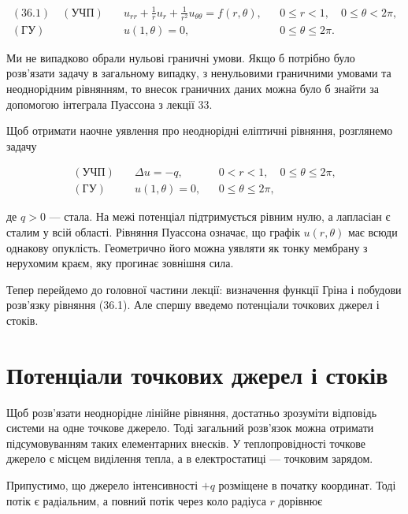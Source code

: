 \documentclass[
  ukrainian,
]{article}
\begin{document}
\[\begin{aligned}(36.1)\quad (\text{УЧП})\quad &u_{rr} + \frac{1}{r}u_r + \frac{1}{r^2}u_{\theta\theta} = f(r,\theta),&& 0 \le r < 1,\quad 0 \le \theta < 2\pi, \\(\text{ГУ})\quad &u(1,\theta)=0,&& 0 \le \theta \le 2\pi.\end{aligned}\]

Ми не випадково обрали нульові граничні умови. Якщо б потрібно було
розв'язати задачу в загальному випадку, з ненульовими граничними умовами
та неоднорідним рівнянням, то внесок граничних даних можна було б знайти
за допомогою інтеграла Пуассона з лекції 33.

Щоб отримати наочне уявлення про неоднорідні еліптичні рівняння,
розглянемо задачу

\[\begin{aligned}(\text{УЧП})\quad & \Delta u = -q, && 0 < r < 1,\quad 0 \le \theta \le 2\pi, \\(\text{ГУ})\quad & u(1,\theta)=0, && 0 \le \theta \le 2\pi,\end{aligned}\]

де \(q>0\) --- стала. На межі потенціал підтримується рівним нулю, а
лапласіан є сталим у всій області. Рівняння Пуассона означає, що графік
\(u(r,\theta)\) має всюди однакову опуклість. Геометрично його можна
уявляти як тонку мембрану з нерухомим краєм, яку прогинає зовнішня сила.

Тепер перейдемо до головної частини лекції: визначення функції Гріна і
побудови розв'язку рівняння (36.1). Але спершу введемо потенціали
точкових джерел і стоків.

\section{Потенціали точкових джерел і
стоків}\label{ux43fux43eux442ux435ux43dux446ux456ux430ux43bux438-ux442ux43eux447ux43aux43eux432ux438ux445-ux434ux436ux435ux440ux435ux43b-ux456-ux441ux442ux43eux43aux456ux432}

Щоб розв'язати неоднорідне лінійне рівняння, достатньо зрозуміти
відповідь системи на одне точкове джерело. Тоді загальний розв'язок
можна отримати підсумовуванням таких елементарних внесків. У
теплопровідності точкове джерело є місцем виділення тепла, а в
електростатиці --- точковим зарядом.

Припустимо, що джерело інтенсивності \(+q\) розміщене в початку
координат. Тоді потік є радіальним, а повний потік через коло радіуса
\(r\) дорівнює
\end{document}
